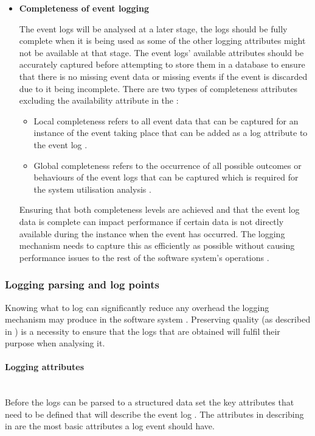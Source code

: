 \begin{itemize}
	\item \textbf{Completeness of event logging}\par The event logs will be analysed at a later stage, the logs should be fully complete when it is being used as some of the other logging attributes might not be available at that stage. The event logs' available attributes should be accurately captured before attempting to store them in a database to ensure that there is no missing event data or missing events if the event is discarded due to it being incomplete. There are two types of completeness attributes excluding the availability attribute in the :

	\begin{itemize}
		\item Local completeness refers to all event data that can be captured for an instance of the event taking place that can be added as a log attribute to the event log \cite{Kherbouche2017, VanDerAalst2004}.
		\item Global completeness refers to the occurrence of all possible outcomes or behaviours of the event logs that can be captured which is required for the system utilisation analysis \cite{Kherbouche2017, VanDerAalst2004}.
	\end{itemize}

	Ensuring that both completeness levels are achieved and that the event log data is complete can impact performance if certain data is not directly available during the instance when the event has occurred. The logging mechanism needs to capture this as efficiently as possible without causing performance issues to the rest of the software system's operations \cite{Zhu2015, Zhu2019}. 
\end{itemize}

\subsubsection{Logging parsing and log points}\label{sec:ch1_loggignPoints}
Knowing what to log can significantly reduce any overhead the logging mechanism may produce in the software system \cite{Jia2018, Pecchia2015}. Preserving quality (as described in ) is a necessity to ensure that the logs that are obtained will fulfil their purpose when analysing it.

\paragraph{Logging attributes}\leavevmode\\
Before the logs can be parsed to a structured data set the key attributes that need to be defined that will describe the event log \cite{Bekeneva2020}. The attributes in describing in  are the most basic attributes a log event should have. 

